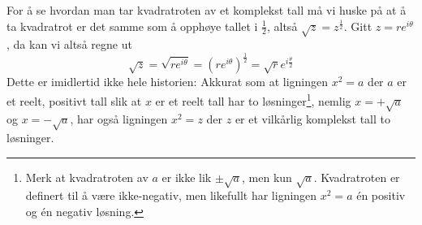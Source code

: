 \documentclass[a4paper,norsk,12pt]{article}
\begin{document}
For å se hvordan man tar kvadratroten av et komplekst tall må vi huske på at å ta kvadratrot er det samme som å opphøye tallet i $\frac12$, altså $\sqrt{z} = z^\frac12$. Gitt $z = re^{i\theta}$, da kan vi altså regne ut
\begin{displaymath}
	\sqrt{z} = \sqrt{re^{i\theta}} = \left(re^{i\theta}\right)^\frac12 = \sqrt{r}e^{i\frac{\theta}{2}}
\end{displaymath}
Dette er imidlertid ikke hele historien: Akkurat som at ligningen $x^2=a$ der $a$ er et reelt, positivt tall slik at $x$ er et reelt tall har to løsninger\footnote{Merk at kvadratroten av $a$ er ikke lik $\pm\sqrt{a}$, men kun $\sqrt{a}$. Kvadratroten er definert til å være ikke-negativ, men likefullt har ligningen $x^2=a$ \'en positiv og \'en negativ løsning.}, nemlig $x=+\sqrt{a}$ og $x =-\sqrt{a}$, har også ligningen $x^2=z$ der $z$ er et vilkårlig komplekst tall to løsninger.
\end{document}

